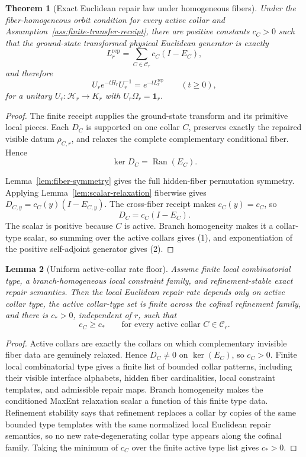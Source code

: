 \documentclass[11pt]{article}
\numberwithin{equation}{section}
\newtheorem{theorem}{Theorem}[section]
\newtheorem{lemma}[theorem]{Lemma}
\theoremstyle{remark}
\newcommand{\Rep}{\mathrm{rep}}
\newcommand{\Hcal}{\mathcal H}
\begin{document}
\begin{theorem}[Exact Euclidean repair law under homogeneous fibers]
\label{thm:ec-law}
Under the fiber-homogeneous orbit condition for every active collar and
Assumption~\ref{ass:finite-transfer-receipt}, there are positive constants
\(c_C>0\) such that the ground-state transformed physical Euclidean
generator is exactly
\[
L_r^{\Rep}=\sum_{C\in\mathcal C_r} c_C(I-E_C),
\tag{1}
\]
and therefore
\[
U_r e^{-tH_r}U_r^{-1}=e^{-tL_r^{\Rep}}
\qquad(t\ge0),
\tag{2}
\]
for a unitary \(U_r:\Hcal_r\to K_r\) with \(U_r\Omega_r=\mathbf 1_r\).
\end{theorem}

\begin{proof}
The finite receipt supplies the ground-state transform and its primitive local pieces. Each
\(D_C\) is supported on one collar \(C\), preserves exactly the repaired visible datum
\(\rho_{C,r}\), and relaxes the complete complementary conditional fiber. Hence
\[
\ker D_C=\operatorname{Ran}(E_C).
\]

Lemma~\ref{lem:fiber-symmetry} gives the full hidden-fiber permutation symmetry. Applying
Lemma~\ref{lem:scalar-relaxation} fiberwise gives
\(D_{C,y}=c_C(y)(I-E_{C,y})\). The cross-fiber receipt makes \(c_C(y)=c_C\), so
\[
D_C=c_C(I-E_C).
\]
The scalar is positive because \(C\) is active. Branch homogeneity makes it a collar-type scalar,
so summing over the active collars gives (1), and exponentiation of the positive self-adjoint
generator gives (2).
\end{proof}

\begin{lemma}[Uniform active-collar rate floor]
\label{lem:floor}
Assume finite local combinatorial type, a branch-homogeneous local constraint family, and
refinement-stable exact repair semantics. Then the local Euclidean repair rate depends only on
active collar type, the active collar-type set is finite across the cofinal refinement family, and
there is \(c_*>0\), independent of \(r\), such that
\[
c_C\ge c_*
\qquad
\text{for every active collar }C\in\mathcal C_r.
\tag{3}
\]
\end{lemma}

\begin{proof}
Active collars are exactly the collars on which complementary invisible fiber data are genuinely
relaxed. Hence \(D_C\neq0\) on \(\ker(E_C)\), so \(c_C>0\). Finite local combinatorial type gives
a finite list of bounded collar patterns, including their visible interface alphabets, hidden
fiber cardinalities, local constraint templates, and admissible repair maps. Branch homogeneity
makes the conditioned MaxEnt relaxation scalar a function of this finite type data. Refinement
stability says that refinement replaces a collar by copies of the same bounded type templates
with the same normalized local Euclidean repair semantics, so no new rate-degenerating collar
type appears along the cofinal family. Taking the minimum of \(c_C\) over the finite active type
list gives \(c_*>0\).
\end{proof}
\end{document}
